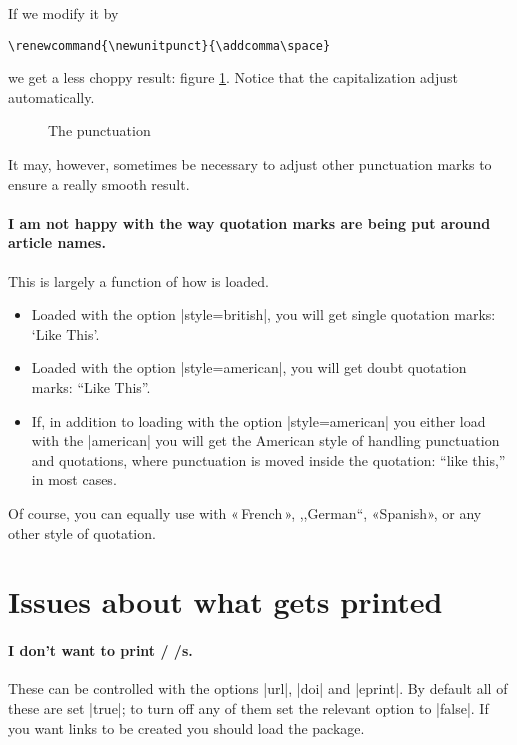 If we modify it by
\begin{Verbatim}
\renewcommand{\newunitpunct}{\addcomma\space}
\end{Verbatim}
we get a less choppy result: figure \ref{punctcite11}. Notice that the
capitalization adjust automatically.\begin{figure}
\caption{The  punctuation\label{punctcite11}}
\end{figure} It may, however, sometimes be necessary to adjust other
punctuation marks to ensure a really smooth result.

\paragraph{I am not happy with the way quotation marks are being put
  around article names.} This is largely a function of how
 is loaded.
\begin{itemize}
\item Loaded with the option |style=british|, you will get single
   quotation marks: `Like This'.
\item Loaded with the option |style=american|, you will get doubt
   quotation marks: ``Like This''.
\item If, in addition to loading  with the option
   |style=american| you either load  with the
   |american| you will get the American style of handling punctuation
   and quotations, where punctuation is moved inside the quotation:
   ``like this,'' in most cases.
\end{itemize}
Of course, you can equally use  with «\,French\,»,
,,German``, «Spanish», or any other style of quotation.


\section{Issues about what gets printed}

\paragraph{I don't want to print \slash
  \slash {}s.} These can be controlled
with the options |url|, |doi| and |eprint|. By default all of these
are set |true|; to turn off any of them set the relevant option to
|false|. If you want links to be created you should load the
 package.

